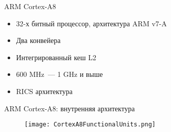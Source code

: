 \documentclass[aspectratio=169,14pt]{beamer}
\begin{document}
\begin{frame}{ARM Cortex-A8}
    \begin{itemize}
        \item 32-х битный процессор, архитектура ARM v7-A
        \item Два конвейера
        \item Интегрированный кеш L2
        \item 600 MHz~--- 1 GHz и выше
        \item RICS архитектура
    \end{itemize}
\end{frame}

\begin{frame}{ARM Cortex-A8: внутренняя архитектура}
    \begin{figure}[c]
        \centering
        \texttt{[image: CortexA8FunctionalUnits.png]}
    \end{figure}
\end{frame}
\end{document}
